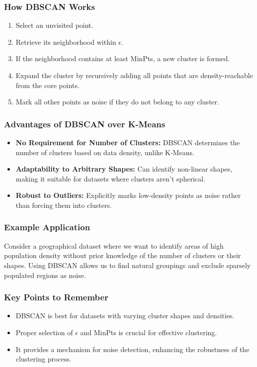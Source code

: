 \documentclass[aspectratio=169]{beamer}
\begin{document}
\begin{frame}[fragile]
    \frametitle{How DBSCAN Works}
    \begin{enumerate}
        \item Select an unvisited point.
        \item Retrieve its neighborhood within $\epsilon$.
        \item If the neighborhood contains at least MinPts, a new cluster is formed.
        \item Expand the cluster by recursively adding all points that are density-reachable from the core points.
        \item Mark all other points as noise if they do not belong to any cluster.
    \end{enumerate}
\end{frame}

\begin{frame}[fragile]
    \frametitle{Advantages of DBSCAN over K-Means}
    \begin{itemize}
        \item \textbf{No Requirement for Number of Clusters:} DBSCAN determines the number of clusters based on data density, unlike K-Means.
        \item \textbf{Adaptability to Arbitrary Shapes:} Can identify non-linear shapes, making it suitable for datasets where clusters aren't spherical.
        \item \textbf{Robust to Outliers:} Explicitly marks low-density points as noise rather than forcing them into clusters.
    \end{itemize}
\end{frame}

\begin{frame}[fragile]
    \frametitle{Example Application}
    Consider a geographical dataset where we want to identify areas of high population density without prior knowledge of the number of clusters or their shapes. 
    Using DBSCAN allows us to find natural groupings and exclude sparsely populated regions as noise.
\end{frame}

\begin{frame}[fragile]
    \frametitle{Key Points to Remember}
    \begin{itemize}
        \item DBSCAN is best for datasets with varying cluster shapes and densities.
        \item Proper selection of $\epsilon$ and MinPts is crucial for effective clustering.
        \item It provides a mechanism for noise detection, enhancing the robustness of the clustering process.
    \end{itemize}
\end{frame}
\end{document}
